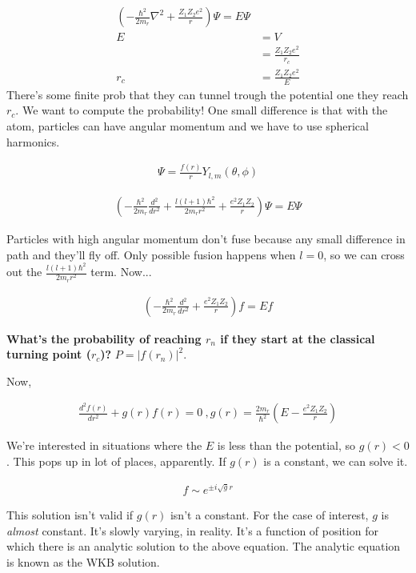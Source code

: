 \begin{align}
\left( -\frac{\hbar^2}{2m_r}\nabla^2 + \frac{Z_1 Z_2 e^2}{r} \right) \Psi = E \Psi\\
E&=V\\
& = \frac{Z_1 Z_2 e^2}{r_c}\\
r_c &= \frac{Z_1 Z_2 e^2}{E}
\end{align}
There's some finite prob that they can tunnel trough the potential one they reach $r_c$. We want to compute the probability! One small difference is that with the atom, particles can have angular momentum and we have to use spherical harmonics.

\begin{align}
\Psi = \frac{f(r)}{r} Y_{l,m}(\theta,\phi)
\end{align}

\begin{align}
\left( -\frac{\hbar^2}{2m_r} \frac{d^2}{dr^2} + \frac{l(l+1)\hbar^2}{2m_r r^2} + \frac{e^2 Z_1 Z_2}{r} \right) \Psi = E \Psi
\end{align}

Particles with high angular momentum don't fuse because any small difference in path and they'll fly off. Only possible fusion happens when $l=0$, so we can cross out the $\frac{l(l+1)\hbar^2}{2m_r r^2} $ term. Now... 

\begin{align}
\left( -\frac{\hbar^2}{2m_r} \frac{d^2}{dr^2} +  \frac{e^2 Z_1 Z_2}{r} \right) f = Ef
\end{align}

\textbf{What's the probability of reaching $r_n$ if they start at the classical turning point ($r_c$)?} $P = | f(r_n)|^2$. 

Now, 

\begin{align}
\frac{d^2 f(r)}{dr^2} + g(r)f(r) = 0~,g(r) = \frac{2m_r}{\hbar^2} \left( E - \frac{e^2 Z_1 Z_2}{r} \right)
\end{align}

We're interested in situations where the $E$ is less than the potential, so $g(r) < 0$. This pops up in  lot of places, apparently. If $g(r)$ is a constant, we can solve it. 

\begin{align}
f \sim e^{\pm i \sqrt{g} r}
\end{align}

This solution isn't valid if $g(r)$ isn't a constant. For the case of interest, $g$ is \textit{almost} constant. It's slowly varying, in reality. It's a function of position for which there is an analytic solution to the above equation. The analytic equation is known as the WKB solution.\\

